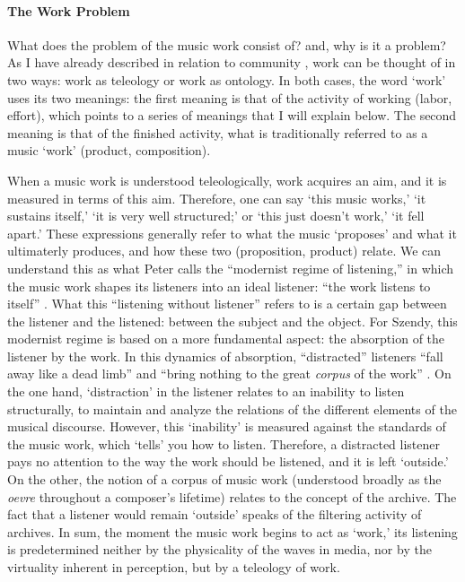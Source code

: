 
\paragraph{The Work Problem}
What does the problem of the music work consist of? and, why is it a problem? As I have already described in relation to community , work can be thought of in two ways: work as teleology or work as ontology. In both cases, the word `work' uses its two meanings: the first meaning is that of the activity of working (labor, effort), which points to a series of meanings that I will explain below. The second meaning is that of the finished activity, what is traditionally referred to as a music `work' (product, composition). 

When a music work is understood teleologically, work acquires an aim, and it is measured in terms of this aim. Therefore, one can say `this music works,' `it sustains itself,' `it is very well structured;' or `this just doesn't work,' `it fell apart.' These expressions generally refer to what the music `proposes' and what it ultimaterly produces, and how these two (proposition, product) relate. We can understand this as what Peter \textcite{Sze08:Lis} calls the ``modernist regime of listening,'' in which the music work shapes its listeners into an ideal listener: ``the work listens to itself'' \parencite[127]{Sze08:Lis}. What this ``listening without listener'' refers to is a certain gap between the listener and the listened: between the subject and the object. For Szendy, this modernist regime is based on a more fundamental aspect: the absorption of the listener by the work. In this dynamics of absorption, ``distracted'' listeners ``fall away like a dead limb'' and ``bring nothing to the great \textit{corpus} of the work'' \parencite[127]{Sze08:Lis}. On the one hand, `distraction' in the listener relates to an inability to listen structurally, to maintain and analyze the relations of the different elements of the musical discourse. However, this `inability' is measured against the standards of the music work, which `tells' you how to listen. Therefore, a distracted listener pays no attention to the way the work should be listened, and it is left `outside.' On the other, the notion of a corpus of music work (understood broadly as the \textit{oevre} throughout a composer's lifetime) relates to the concept of the archive. The fact that a listener would remain `outside' speaks of the filtering activity of archives. 
In sum, the moment the music work begins to act as `work,' its listening is predetermined neither by the physicality of the waves in media, nor by the virtuality inherent in perception, but by a teleology of work. 

